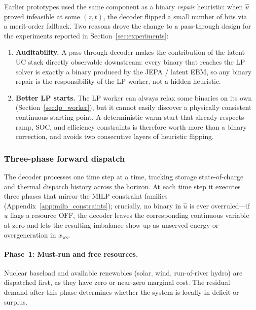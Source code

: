 \documentclass{article}
\begin{document}
Earlier prototypes used the same component as a binary \emph{repair} heuristic: when $\hat{u}$ proved infeasible at some $(z, t)$, the decoder flipped a small number of bits via a merit-order fallback. Two reasons drove the change to a pass-through design for the experiments reported in Section~\ref{sec:experiments}:

\begin{enumerate}[noitemsep]
  \item \textbf{Auditability.} A pass-through decoder makes the contribution of the latent UC stack directly observable downstream: every binary that reaches the LP solver is exactly a binary produced by the JEPA / latent EBM, so any binary repair is the responsibility of the LP worker, not a hidden heuristic.
  \item \textbf{Better LP starts.} The LP worker can always relax some binaries on its own (Section~\ref{sec:lp_worker}), but it cannot easily discover a physically consistent continuous starting point. A deterministic warm-start that already respects ramp, SOC, and efficiency constraints is therefore worth more than a binary correction, and avoids two consecutive layers of heuristic flipping.
\end{enumerate}

\subsubsection{Three-phase forward dispatch}

The decoder processes one time step at a time, tracking storage state-of-charge and thermal dispatch history across the horizon. At each time step it executes three phases that mirror the MILP constraint families (Appendix~\ref{app:milp_constraints}); crucially, no binary in $\hat{u}$ is ever overruled---if $\hat u$ flags a resource OFF, the decoder leaves the corresponding continuous variable at zero and lets the resulting imbalance show up as unserved energy or overgeneration in $x_{\mathrm{ws}}$.

\paragraph{Phase~1: Must-run and free resources.}
Nuclear baseload and available renewables (solar, wind, run-of-river hydro) are dispatched first, as they have zero or near-zero marginal cost. The residual demand after this phase determines whether the system is locally in deficit or surplus.
\end{document}
